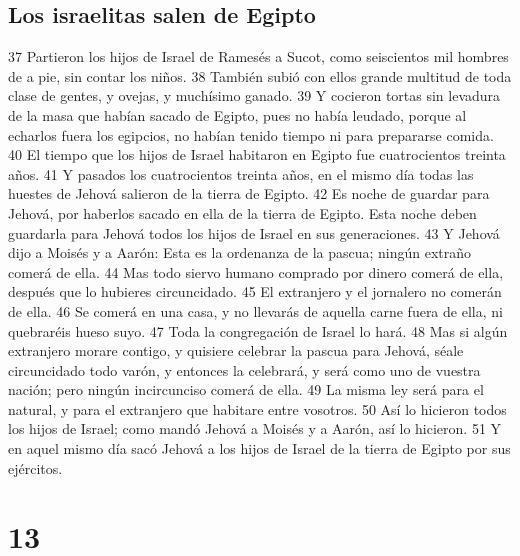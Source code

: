 \section{Los israelitas salen de Egipto}
37 Partieron los hijos de Israel de Ramesés a Sucot, como seiscientos mil hombres de a pie, sin contar los niños.
38 También subió con ellos grande multitud de toda clase de gentes, y ovejas, y muchísimo ganado.
39 Y cocieron tortas sin levadura de la masa que habían sacado de Egipto, pues no había leudado, porque al echarlos fuera los egipcios, no habían tenido tiempo ni para prepararse comida.
40 El tiempo que los hijos de Israel habitaron en Egipto fue cuatrocientos treinta años.
41 Y pasados los cuatrocientos treinta años, en el mismo día todas las huestes de Jehová salieron de la tierra de Egipto.
42 Es noche de guardar para Jehová, por haberlos sacado en ella de la tierra de Egipto. Esta noche deben guardarla para Jehová todos los hijos de Israel en sus generaciones.
43 Y Jehová dijo a Moisés y a Aarón: Esta es la ordenanza de la pascua; ningún extraño comerá de ella.
44 Mas todo siervo humano comprado por dinero comerá de ella, después que lo hubieres circuncidado.
45 El extranjero y el jornalero no comerán de ella.
46 Se comerá en una casa, y no llevarás de aquella carne fuera de ella, ni quebraréis hueso suyo.
47 Toda la congregación de Israel lo hará.
48 Mas si algún extranjero morare contigo, y quisiere celebrar la pascua para Jehová, séale circuncidado todo varón, y entonces la celebrará, y será como uno de vuestra nación; pero ningún incircunciso comerá de ella.
49 La misma ley será para el natural, y para el extranjero que habitare entre vosotros.
50 Así lo hicieron todos los hijos de Israel; como mandó Jehová a Moisés y a Aarón, así lo hicieron.
51 Y en aquel mismo día sacó Jehová a los hijos de Israel de la tierra de Egipto por sus ejércitos.

\chapter{13}

